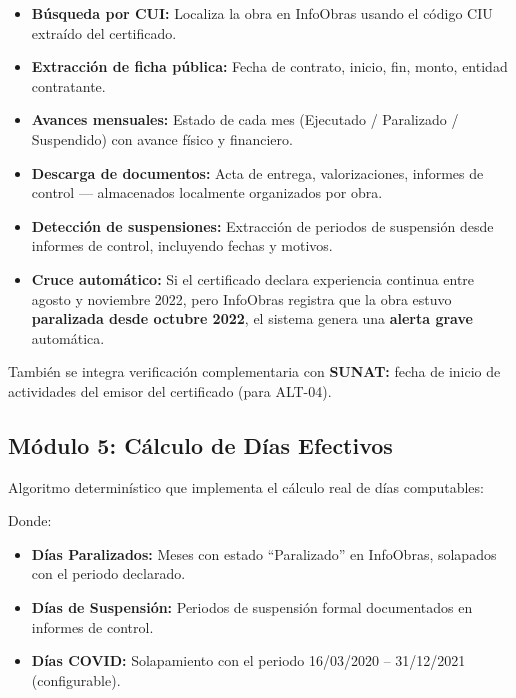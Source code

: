 \documentclass[11pt,a4paper]{article}
\begin{document}
\begin{itemize}[leftmargin=*]
    \item \textbf{Búsqueda por CUI:} Localiza la obra en InfoObras usando el código CIU extraído del certificado.
    \item \textbf{Extracción de ficha pública:} Fecha de contrato, inicio, fin, monto, entidad contratante.
    \item \textbf{Avances mensuales:} Estado de cada mes (Ejecutado / Paralizado / Suspendido) con avance físico y financiero.
    \item \textbf{Descarga de documentos:} Acta de entrega, valorizaciones, informes de control --- almacenados localmente organizados por obra.
    \item \textbf{Detección de suspensiones:} Extracción de periodos de suspensión desde informes de control, incluyendo fechas y motivos.
    \item \textbf{Cruce automático:} Si el certificado declara experiencia continua entre agosto y noviembre 2022, pero InfoObras registra que la obra estuvo \textbf{paralizada desde octubre 2022}, el sistema genera una \textbf{alerta grave} automática.
\end{itemize}

También se integra verificación complementaria con \textbf{SUNAT:} fecha de inicio de actividades del emisor del certificado (para ALT-04).

\subsection{Módulo 5: Cálculo de Días Efectivos}

Algoritmo determinístico que implementa el cálculo real de días computables:

\begin{center}
\end{center}

Donde:
\begin{itemize}[leftmargin=*,noitemsep]
    \item \textbf{Días Paralizados:} Meses con estado ``Paralizado'' en InfoObras, solapados con el periodo declarado.
    \item \textbf{Días de Suspensión:} Periodos de suspensión formal documentados en informes de control.
    \item \textbf{Días COVID:} Solapamiento con el periodo 16/03/2020 -- 31/12/2021 (configurable).
\end{itemize}
\end{document}

